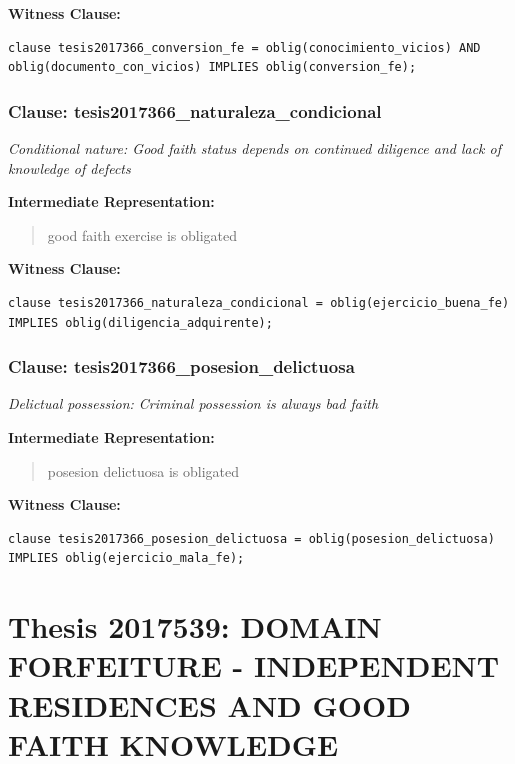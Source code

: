\documentclass[11pt,a4paper]{article}
\begin{document}
\textbf{Witness Clause:}

\begin{lstlisting}[style=witnessstyle, language=Witness]
clause tesis2017366_conversion_fe = oblig(conocimiento_vicios) AND oblig(documento_con_vicios) IMPLIES oblig(conversion_fe);
\end{lstlisting}

\subsubsection{Clause: tesis2017366\_naturaleza\_condicional}

\textit{Conditional nature: Good faith status depends on continued diligence and lack of knowledge of defects}

\textbf{Intermediate Representation:}

\begin{quote}
good faith exercise is obligated
\end{quote}

\textbf{Witness Clause:}

\begin{lstlisting}[style=witnessstyle, language=Witness]
clause tesis2017366_naturaleza_condicional = oblig(ejercicio_buena_fe) IMPLIES oblig(diligencia_adquirente);
\end{lstlisting}

\subsubsection{Clause: tesis2017366\_posesion\_delictuosa}

\textit{Delictual possession: Criminal possession is always bad faith}

\textbf{Intermediate Representation:}

\begin{quote}
posesion delictuosa is obligated
\end{quote}

\textbf{Witness Clause:}

\begin{lstlisting}[style=witnessstyle, language=Witness]
clause tesis2017366_posesion_delictuosa = oblig(posesion_delictuosa) IMPLIES oblig(ejercicio_mala_fe);
\end{lstlisting}

\newpage

\section{Thesis 2017539: DOMAIN FORFEITURE - INDEPENDENT RESIDENCES AND GOOD FAITH KNOWLEDGE}
\label{thesis:2017539}
\end{document}
